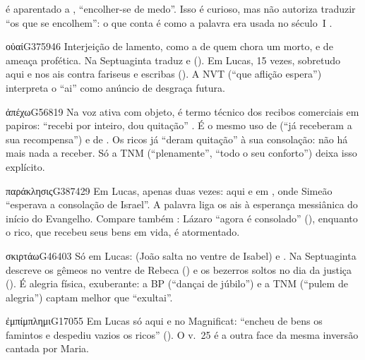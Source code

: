 \begin{alerta}
 é aparentado a , \enquote{encolher-se de medo}. Isso é
curioso, mas não autoriza traduzir \enquote{os que se encolhem}: o que conta é
como a palavra era usada no século~I \parencite{carson1996}.
\end{alerta}

\begin{lexico}{οὐαί}{G3759}{46}
Interjeição de lamento, como a de quem chora um morto, e de ameaça
profética. Na Septuaginta traduz  e  (). Em Lucas, 15 vezes, sobretudo aqui e nos ais contra fariseus e
escribas (). A NVT (\enquote{que aflição espera}) interpreta o
\enquote{ai} como anúncio de desgraça futura.
\end{lexico}

\begin{lexico}{ἀπέχω}{G568}{19}
Na voz ativa com objeto, é termo técnico dos recibos comerciais em papiros:
\enquote{recebi por inteiro, dou quitação} \parencite{deissmann1927}. É o mesmo
uso de  (\enquote{já receberam a sua recompensa}) e de
. Os ricos já \enquote{deram quitação} à sua consolação: não há
mais nada a receber. Só a TNM (\enquote{plenamente}, \enquote{todo o seu
conforto}) deixa isso explícito.
\end{lexico}

\begin{lexico}{παράκλησις}{G3874}{29}
Em Lucas, apenas duas vezes: aqui e em , onde Simeão
\enquote{esperava a consolação de Israel}. A palavra liga os ais à esperança
messiânica do início do Evangelho. Compare também : Lázaro
\enquote{agora é consolado} (), enquanto o rico, que recebeu
seus bens em vida, é atormentado.
\end{lexico}

\begin{lexico}{σκιρτάω}{G4640}{3}
Só em Lucas:  (João salta no ventre de Isabel) e .
Na Septuaginta descreve os gêmeos no ventre de Rebeca () e os
bezerros soltos no dia da justiça (). É alegria física,
exuberante: a BP (\enquote{dançai de júbilo}) e a TNM (\enquote{pulem de
alegria}) captam melhor que \enquote{exultai}.
\end{lexico}

\begin{lexico}{ἐμπίμπλημι}{G1705}{5}
Em Lucas só aqui e no Magnificat: \enquote{encheu de bens os famintos e
despediu vazios os ricos} (). O v.~25 é a outra face da mesma
inversão cantada por Maria.
\end{lexico}

